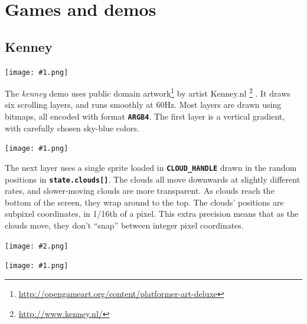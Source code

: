 \documentclass[10pt]{book}
\newcommand{\png}[1]{
\begin{center}
\texttt{[image: \#1.png]}
\end{center}
}
\newcommand{\szpng}[2]{
\begin{center}
\texttt{[image: \#2.png]}
\end{center}
}
\newcommand{\mach}[1]{\texttt{\textbf{#1}}}
\begin{document}
\chapter{Games and demos}

\newpage
\section{Kenney}

\png{kenney}

The \textit{kenney} demo uses public domain artwork\footnote{\url{http://opengameart.org/content/platformer-art-deluxe}}
by artist Kenney.nl
\footnote{\url{http://www.kenney.nl/}}
.
It draws six scrolling layers,
and runs smoothly at 60Hz.
Most layers are drawn using bitmaps, all encoded with format \mach{ARGB4}.
The first layer is a vertical gradient, with carefully chosen sky-blue colors.

\png{kenney_0}

\noindent
The next layer uses a single sprite loaded in \mach{CLOUD\_HANDLE}
drawn in the random positions in \mach{state.clouds[]}.
The clouds all move downwards at slightly different rates,
and slower-moving clouds are more transparent.
As clouds reach the bottom of the screen, they wrap around to the top.
The clouds' positions are subpixel coordinates, in 1/16th of a pixel.
This extra precision means that as the clouds move, they don't ``snap''
between integer pixel coordinates.

\szpng{0.2}{previews/kenney-CLOUD-00}
\png{kenney_1}
\end{document}
